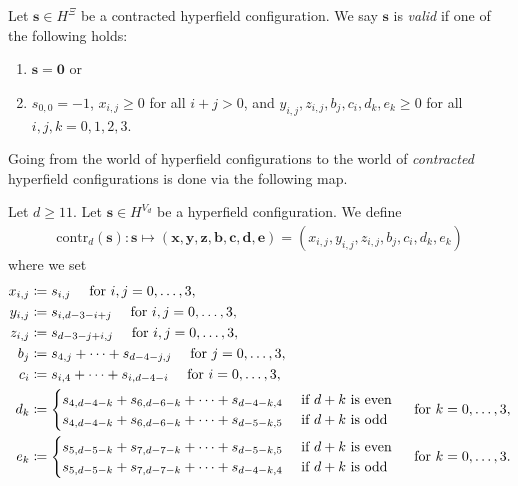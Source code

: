 \begin{definition}
    Let \( \mathbf{s} \in H^{\Xi}\) be a {contracted hyperfield configuration}.
    We say \( \mathbf{s} \) is \emph{valid} if one of the following holds:
    \begin{enumerate}
        \item \( \mathbf{s} = \mathbf{0} \) or
        \item \( s_{0,0} = -1 \), \( x_{i,j} \geq 0 \) for all \( i+j > 0 \), and \(  y_{i,j}, z_{i,j}, b_j, c_i, d_k, e_k \geq 0 \) for all \( i,j,k = 0,1,2,3 \).
    \end{enumerate}
\end{definition}

Going from the world of hyperfield configurations to the world of \emph{contracted} hyperfield configurations is done via the following map.

\begin{definition}
    Let \( d \geq 11 \). Let \( \mathbf{s} \in H^{V_d} \) be a hyperfield configuration. We define 
    \begin{align*}
        \mathrm{contr}_d(\mathbf{s}): \mathbf{s} \mapsto (\mathbf{x}, \mathbf{y}, \mathbf{z}, \mathbf{b}, \mathbf{c}, \mathbf{d}, \mathbf{e}) = (x_{i,j}, y_{i,j}, z_{i,j}, b_j, c_i, d_k, e_k)
    \end{align*}
    where we set
    \begin{align*}
        x_{i,j} &\coloneqq s_{i,j} \quad \text{ for } i,j = 0, \dots, 3, \\
        y_{i,j} &\coloneqq s_{i, d-3-i+j} \quad \text{ for } i,j = 0, \dots, 3, \\
        z_{i,j} &\coloneqq s_{d-3-j+i,j} \quad \text{ for } i,j = 0, \dots, 3, \\
        b_j &\coloneqq s_{4,j} + \dots + s_{d-4-j,j} \quad \text{ for } j = 0, \dots, 3, \\
        c_i &\coloneqq s_{i,4} + \dots + s_{i,d-4-i} \quad \text{ for } i = 0, \dots, 3, \\
        d_k &\coloneqq \begin{cases}
            s_{4,d-4-k} + s_{6,d-6-k} + \dots + s_{d-4-k,4} & \text{ if \( d + k \) is even} \\
            s_{4,d-4-k} + s_{6,d-6-k} + \dots + s_{d-5-k,5} & \text{ if \( d + k \) is odd}
        \end{cases} \quad \text{ for } k = 0, \dots, 3, \\
        e_k &\coloneqq \begin{cases}
            s_{5,d-5-k} + s_{7,d-7-k} + \dots + s_{d-5-k,5} & \text{ if \( d + k \) is even} \\
            s_{5,d-5-k} + s_{7,d-7-k} + \dots + s_{d-4-k,4} & \text{ if \( d + k \) is odd}
        \end{cases} \quad \text{ for } k = 0, \dots, 3.
    \end{align*}
\end{definition}

